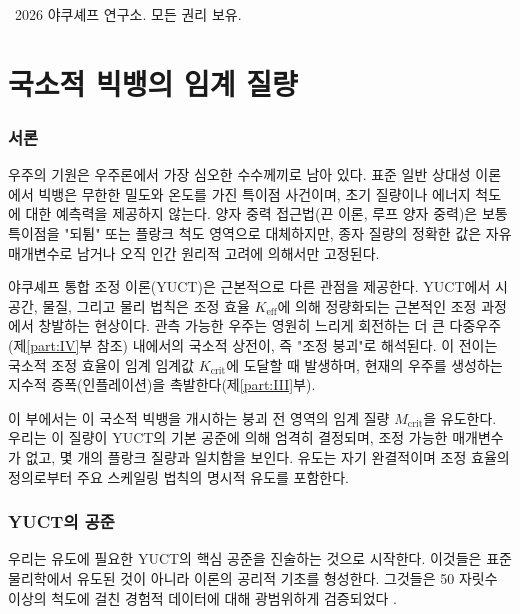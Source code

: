 \documentclass[11pt,a4paper]{article}
\begin{document}
	\vspace{0.5cm}
	\noindent
	\textcopyright\ 2026 야쿠셰프 연구소. 모든 권리 보유.
	
	\tableofcontents
	\newpage
	
	\part{국소적 빅뱅의 임계 질량}
	\label{part:I}
	
	\section{서론}
	
	우주의 기원은 우주론에서 가장 심오한 수수께끼로 남아 있다. 표준 일반 상대성 이론에서 빅뱅은 무한한 밀도와 온도를 가진 특이점 사건이며, 초기 질량이나 에너지 척도에 대한 예측력을 제공하지 않는다. 양자 중력 접근법(끈 이론, 루프 양자 중력)은 보통 특이점을 "되튐" 또는 플랑크 척도 영역으로 대체하지만, 종자 질량의 정확한 값은 자유 매개변수로 남거나 오직 인간 원리적 고려에 의해서만 고정된다.
	
	야쿠셰프 통합 조정 이론(YUCT)은 근본적으로 다른 관점을 제공한다. YUCT에서 시공간, 물질, 그리고 물리 법칙은 조정 효율 \(K_{\mathrm{eff}}\)에 의해 정량화되는 근본적인 조정 과정에서 창발하는 현상이다. 관측 가능한 우주는 영원히 느리게 회전하는 더 큰 다중우주(제\ref{part:IV}부 참조) 내에서의 국소적 상전이, 즉 "조정 붕괴"로 해석된다. 이 전이는 국소적 조정 효율이 임계 임계값 \(K_{\mathrm{crit}}\)에 도달할 때 발생하며, 현재의 우주를 생성하는 지수적 증폭(인플레이션)을 촉발한다(제\ref{part:III}부).
	
	이 부에서는 이 국소적 빅뱅을 개시하는 붕괴 전 영역의 임계 질량 \(M_{\mathrm{crit}}\)을 유도한다. 우리는 이 질량이 YUCT의 기본 공준에 의해 엄격히 결정되며, 조정 가능한 매개변수가 없고, 몇 개의 플랑크 질량과 일치함을 보인다. 유도는 자기 완결적이며 조정 효율의 정의로부터 주요 스케일링 법칙의 명시적 유도를 포함한다.
	
	\section{YUCT의 공준}
	
	우리는 유도에 필요한 YUCT의 핵심 공준을 진술하는 것으로 시작한다. 이것들은 표준 물리학에서 유도된 것이 아니라 이론의 공리적 기초를 형성한다. 그것들은 50 자릿수 이상의 척도에 걸친 경험적 데이터에 대해 광범위하게 검증되었다 \cite{AppendixL}.
	
\end{document}

